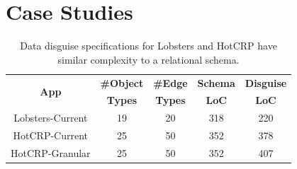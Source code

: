 \section{Case Studies}
\label{sec:hotcrp_example}

\begin{table}[t!]
    \centering
    \footnotesize
    \begin{tabular}{@{}ccccc@{}}
        \multirow{2}{*}{\textbf{App}} & \textbf{\#Object} & \textbf{\#Edge} & \textbf{Schema} &
        \textbf{Disguise} \\
        & \textbf{Types} & \textbf{Types} & \textbf{LoC} & \textbf{LoC} \\
    \midrule
    Lobsters-Current & 19 & 20 & 318 & 220 \\
    HotCRP-Current & 25 & 50 & 352 & 378 \\
    HotCRP-Granular & 25 & 50 & 352 & 407 \\
\end{tabular}
    \caption{Data disguise specifications for Lobsters and HotCRP have similar complexity to
    a relational schema.
    }
\label{tab:loc}
\end{table}

